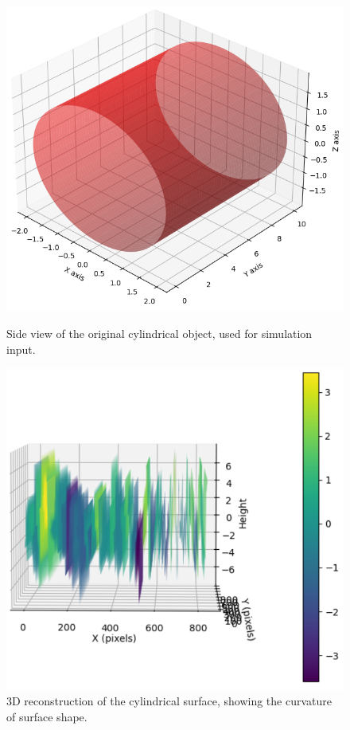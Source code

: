 \documentclass[../main.tex]{subfiles}
\begin{document}
\begin{figure}[H]
    \centering
    \hfill
    \begin{minipage}{0.49\textwidth}
        \centering
        \includegraphics[width=0.95\linewidth]{Images/Results/Cylinder_sideview}
        \caption{Side view of the original cylindrical object, used for simulation input.}
        \label{fig:Cylinder_sideview}
    \end{minipage}
    \hfill
    \begin{minipage}{0.49\textwidth}
        \centering
        \includegraphics[width=1\linewidth]{Images/Results/Cylinder_reconstruction}
        \caption{3D reconstruction of the cylindrical surface, showing the curvature of surface shape.}
        \label{fig:Cylinder_reconstruction}
    \end{minipage}
\end{figure}
\vspace{-15pt}
\end{document}
